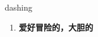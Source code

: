 
\begin{frame}
{\huge dashing}
\begin{center}
\begin{enumerate}\Large
  \item \textbf{爱好冒险的，大胆的}
\end{enumerate}
\end{center}
\end{frame}
